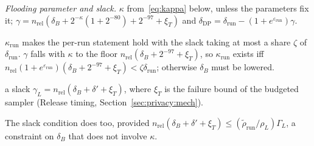   \item \emph{Flooding parameter and slack.} $\kappa$ from~\eqref{eq:kappa} below, unless the parameters fix it; $\gamma = n_{\mathrm{rel}}(\delta_B + 2^{-\kappa}(1 + 2^{-80}) + 2^{-97} + \xi_T)$ and $\delta_{\mathrm{DP}} = \delta_{\mathrm{run}} - (1 + e^{\varepsilon_{\mathrm{run}}})\gamma$.

  \item $\kappa_{\mathrm{run}}$ makes the per-run statement hold with the slack taking at most a share $\zeta$ of $\delta_{\mathrm{run}}$. $\gamma$ falls with $\kappa$ to the floor $n_{\mathrm{rel}}(\delta_B + 2^{-97} + \xi_T)$, so $\kappa_{\mathrm{run}}$ exists iff $n_{\mathrm{rel}}(1 + e^{\varepsilon_{\mathrm{run}}})(\delta_B + 2^{-97} + \xi_T) < \zeta\delta_{\mathrm{run}}$; otherwise $\delta_B$ must be lowered.

  \item a slack $\gamma_L = n_{\mathrm{rel}}(\delta_B + \delta' + \xi_T)$, where $\xi_T$ is the failure bound of the budgeted sampler (Release timing, Section~\ref{sec:privacy:mech}).

The slack condition does too, provided $n_{\mathrm{rel}}(\delta_B + \delta' + \xi_T) \le (\tilde\rho_{\mathrm{run}}/\rho_L)\Gamma_L$, a constraint on $\delta_B$ that does not involve $\kappa$.

